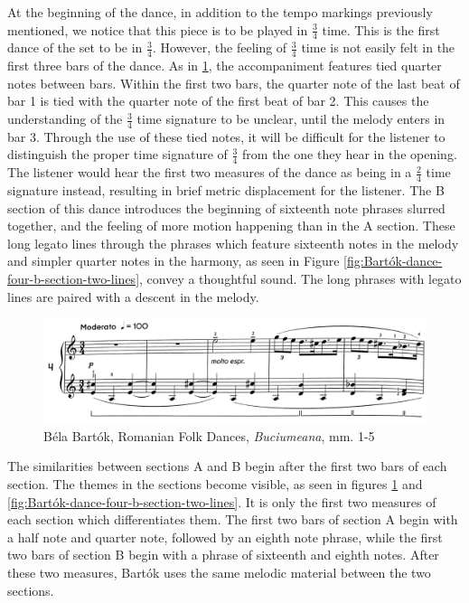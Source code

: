 At the beginning of the dance, in addition to the tempo markings previously mentioned, we notice that this piece is to be played in $\frac{3}{4}$ time. This is the first dance of the set to be in $\frac{3}{4}$. However, the feeling of $\frac{3}{4}$ time is not easily felt in the first three bars of the dance. As in \ref{fig:Bartók-dance-four-first-line}\autocite{Lung_2016}, the accompaniment features tied quarter notes between bars. Within the first two bars, the quarter note of the last beat of bar 1 is tied with the quarter note of the first beat of bar 2. This causes the understanding of the $\frac{3}{4}$ time signature to be unclear, until the melody enters in bar 3. Through the use of these tied notes, it will be difficult for the listener to distinguish the proper time signature of $\frac{3}{4}$ from the one they hear in the opening. The listener would hear the first two measures of the dance as being in a $\frac{2}{4}$ time signature instead, resulting in brief metric displacement for the listener. The B section of this dance introduces the beginning of sixteenth note phrases slurred together, and the feeling of more motion happening than in the A section. These long legato lines through the phrases which feature sixteenth notes in the melody and simpler quarter notes in the harmony, as seen in Figure \ref{fig:Bartók-dance-four-b-section-two-lines}\autocite{Lung_2016}, convey a thoughtful sound. The long phrases with legato lines are paired with a descent in the melody. 

\begin{figure}[h]
  \centering
  \includegraphics[width=\textwidth]{figures/bartok-dance-four-first-line.jpg}
  \caption{Béla Bartók, Romanian Folk Dances, \textit{Buciumeana}, mm. 1-5}
  \label{fig:Bartók-dance-four-first-line}
\end{figure}


The similarities between sections A and B begin after the first two bars of each section. The themes in the sections become visible, as seen in figures \ref{fig:Bartók-dance-four-first-line}\autocite{Lung_2016} and \ref{fig:Bartók-dance-four-b-section-two-lines}\autocite{Lung_2016}. It is only the first two measures of each section which differentiates them. The first two bars of section A begin with a half note and quarter note, followed by an eighth note phrase, while the first two bars of section B begin with a phrase of sixteenth and eighth notes. After these two measures, Bartók uses the same melodic material between the two sections. 

